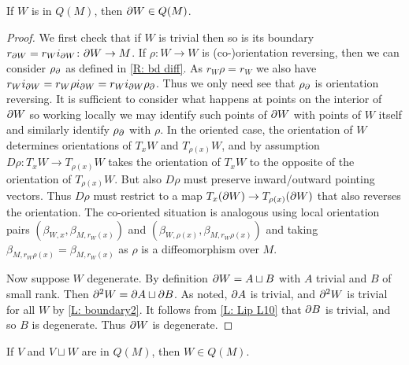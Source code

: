 \begin{lemma}\label{L: bd defined}
If $W$ is in $Q(M)$, then $\partial W \in Q(M)$.
\end{lemma}
\begin{proof}
We first check that if $W$ is trivial then so is its boundary $r_{\partial W} = r_Wi_{\partial W} \colon \partial W \to M$. If $\rho \colon W \to W$ is (co-)orientation reversing, then we can consider $\rho_\partial$ as defined in \cref{R: bd diff}. As $r_W\rho = r_W$ we also have $r_Wi_{\partial W} = r_W\rho i_{\partial W} = r_W i_{\partial W} \rho_\partial$. Thus we only need see that $\rho_\partial$ is orientation reversing. It is sufficient to consider what happens at points on the interior of $\partial W$ so working locally we may identify such points of $\partial W$ with points of $W$ itself and similarly identify $\rho_\partial$ with $\rho$. In the oriented case, the orientation of $W$ determines orientations of $T_xW$ and $T_{\rho(x)}W$, and by assumption $D\rho: T_xW \to T_{\rho(x)}W$ takes the orientation of $T_xW$ to the opposite of the orientation of $T_{\rho(x)}W$. But also $D\rho$ must preserve inward/outward pointing vectors. Thus $D\rho$ must restrict to a map $T_x (\partial W) \to T_{\rho(x)}(\partial W)$ that also reverses the orientation. The co-oriented situation is analogous using local orientation pairs $\left(\beta_{W,x}, \beta_{M,r_W(x)}\right)$ and $\left(\beta_{W,\rho(x)}, \beta_{M,r_W\rho(x)}\right)$ and taking $\beta_{M,r_W\rho(x)} = \beta_{M,r_W(x)}$ as $\rho$ is a diffeomorphism over $M$.



Now suppose $W$ degenerate. By definition $\partial W = A \sqcup B$ with $A$ trivial and $B$ of small rank. Then $\partial^2 W = \partial A \sqcup \partial B$. As noted, $\partial A$ is trivial, and $\partial^2 W$ is trivial for all $W$ by \cref{L: boundary2}. It follows from \cref{L: Lip L10} that $\partial B$ is trivial, and so $B$ is degenerate. Thus $\partial W$ is degenerate.
\end{proof}


\begin{lemma}\label{L: Lipy12}
If $V$ and $V \sqcup W$ are in $Q(M)$, then $W \in Q(M)$.
\end{lemma}

